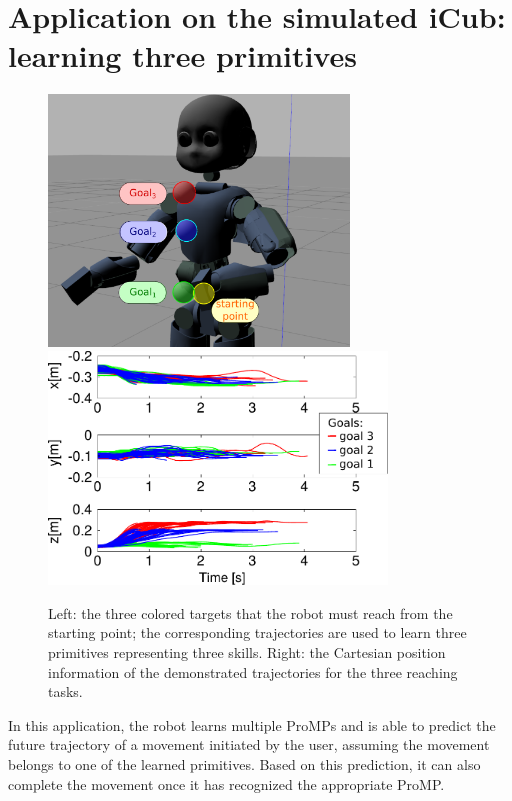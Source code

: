 \documentclass[utf8]{frontiersSCNS} %
\begin{document}
\section{Application on the simulated iCub: learning three primitives}
\label{sec:3ProMPsAppli}
\begin{figure}[h]
\centering
{\includegraphics[width=8cm]{img/gazeboGoalsV2.pdf}
\hspace{0.1cm}
\includegraphics[width=9cm]{img/3DOFtrajectories.pdf}
}
\caption{Left: the three colored targets that the robot must reach from the starting point; the corresponding trajectories are used to learn three primitives representing three skills. 
Right: the Cartesian position information of the demonstrated trajectories for the three reaching tasks.}%
\label{fig:3TargetsTrajectories}
\label{fig:GazeboGoal}
\end{figure}

In this application, the robot learns multiple ProMPs and is able to predict the future trajectory of a movement initiated by the user, assuming the movement belongs to one of the learned primitives. Based on this prediction, it can also complete the movement once it has recognized the appropriate ProMP. 
\end{document}

